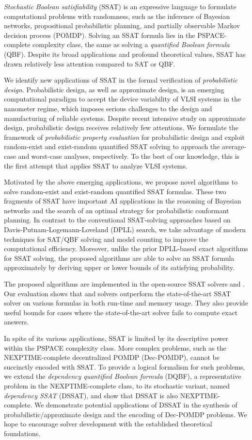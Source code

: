 \textit{Stochastic Boolean satisfiability} (SSAT) is an expressive language
to formulate computational problems with randomness,
such as the inference of Bayesian networks,
propositional probabilistic planning,
and partially observable Markov decision process (POMDP).
Solving an SSAT formula lies in the PSPACE-complete complexity class,
the same as solving a \textit{quantified Boolean formula} (QBF).
Despite its broad applications and profound theoretical values,
SSAT has drawn relatively less attention compared to SAT or QBF.

We identify new applications of SSAT in the formal verification of \textit{probabilistic design}.
Probabilistic design, as well as approximate design,
is an emerging computational paradigm to accept the device variability of VLSI systems in the nanometer regime,
which imposes serious challenges to the design and manufacturing of reliable systems.
Despite recent intensive study on approximate design,
probabilistic design receives relatively few attentions.
We formulate the framework of \textit{probabilistic property evaluation} for probabilistic design
and exploit random-exist and exist-random quantified SSAT solving
to approach the average-case and worst-case analyses, respectively.
To the best of our knowledge,
this is the first attempt that applies SSAT to analyze VLSI systems.

Motivated by the above emerging applications,
we propose novel algorithms to solve random-exist and exist-random quantified SSAT formulas.
These two fragments of SSAT have important AI applications
in the reasoning of Bayesian networks and
the search of an optimal strategy for probabilistic conformant planning.
In contrast to the conventional SSAT-solving approaches
based on Davis-Putnam-Logemann-Loveland (DPLL) search,
we take advantage of modern techniques for SAT/QBF solving and model counting
to improve the computational efficiency.
Moreover, unlike the prior DPLL-based exact algorithms for SSAT solving,
the proposed algorithms are able to solve an SSAT formula approximately
by deriving upper or lower bounds of its satisfying probability.

The proposed algorithms are implemented in the open-source SSAT solvers \ressat and \erssat.
Our evaluation shows that \ressat and \erssat solvers outperform the state-of-the-art SSAT solver
on various formulas in both run-time and memory usage.
They also provide useful bounds for cases where the state-of-the-art solver fails to compute exact answers.

In spite of its various applications,
SSAT is limited by its descriptive power within the PSPACE complexity class.
More complex problems,
such as the NEXPTIME-complete decentralized POMDP (Dec-POMDP),
cannot be succinctly encoded with SSAT.
To provide a logical formalism for such problems,
we extend the \textit{dependency quantified Boolean formula} (DQBF),
a representative problem in the NEXPTIME-complete class,
to its stochastic variant,
named \textit{dependency SSAT} (DSSAT),
and show that DSSAT is also NEXPTIME-complete.
We demonstrate potential applications of DSSAT
in the synthesis of probabilistic/approximate design
and the encoding of Dec-POMDP problems.
We hope to encourage solver development with the established theoretical foundations.

